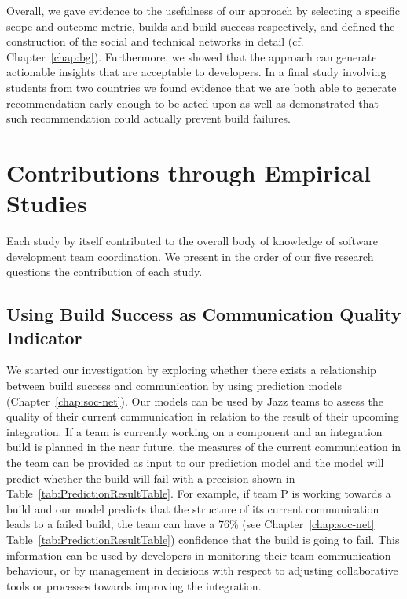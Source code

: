 Overall, we gave evidence to the usefulness of our approach by selecting a specific scope and outcome metric, builds and build success respectively, and defined the construction of the social and technical networks in detail (cf. Chapter~\ref{chap:bg}).
Furthermore, we showed that the approach can generate actionable insights that are acceptable to developers.
In a final study involving students from two countries we found evidence that we are both able to generate recommendation early enough to be acted upon as well as demonstrated that such recommendation could actually prevent build failures.



\section{Contributions through Empirical Studies}
\label{sec:cont:emp}
Each study by itself contributed to the overall body of knowledge of software development team coordination.
We present in the order of our five research questions the contribution of each  study.


\subsection{Using Build Success as Communication Quality Indicator}
\label{subsec:practicalimpl}
%
We started our investigation by exploring whether there exists a relationship between build success and communication by using prediction models (Chapter~\ref{chap:soc-net}).
Our models can be used by Jazz teams to assess the quality of their current
communication in relation to the result of their upcoming integration. If a team
is currently working on a component and an integration build is planned in the
near future, the measures of the current communication in the team can be
provided as input to our prediction model and the model will predict whether the
build will fail with a precision shown in Table~\ref{tab:PredictionResultTable}.
For example, if team P is working towards a build and our model predicts that the
structure of its current communication leads to a failed build, the team can have
a 76\% (see Chapter~\ref{chap:soc-net} Table~\ref{tab:PredictionResultTable}) confidence that the build is
going to fail. This information can be used by developers in monitoring their
team communication behaviour, or by management in decisions with respect to
adjusting collaborative tools or processes towards improving the integration.

